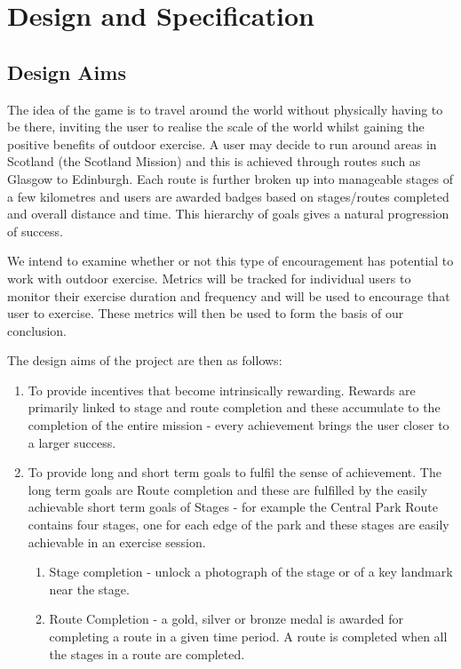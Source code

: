 \chapter{Design and Specification}\label{ch_method}

\section{Design Aims}

The idea of the game is to travel around the world without physically
having to be there, inviting the user to realise the scale of the
world whilst gaining the positive benefits of outdoor exercise. A user
may decide to run around areas in Scotland (the Scotland Mission) and
this is achieved through routes such as Glasgow to Edinburgh. Each
route is further broken up into manageable stages of a few kilometres
and users are awarded badges based on stages/routes completed and
overall distance and time. This hierarchy of goals gives a natural
progression of success.

We intend to examine whether or not this type of encouragement
has potential to work with outdoor exercise. Metrics will be tracked
for individual users to monitor their exercise duration and frequency
and will be used to encourage that user to exercise. These metrics will
then be used to form the basis of our conclusion.

The design aims of the project are then as follows:
\begin{enumerate}
  \item To provide incentives that become intrinsically
    rewarding. Rewards are primarily linked to stage and route 
    completion and these accumulate to the completion of the entire
    mission - every achievement brings the user closer to a larger
    success. 
  \item To provide long and short term goals to fulfil the sense of
    achievement. The long term goals are Route completion and these are
    fulfilled by the easily achievable short term goals of Stages -
    for example the Central Park Route contains four stages, one for
    each edge of the park and these stages are easily achievable in an
    exercise session.
    \begin{enumerate}
      \item Stage completion - unlock a photograph of the stage or of
        a key landmark near the stage. 
      \item Route Completion - a gold, silver or bronze medal is
        awarded for completing a route in a given time period. A route
        is completed when all the stages in a route are completed.
    \end{enumerate}
\end{enumerate}

